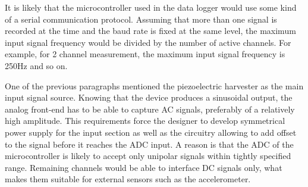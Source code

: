 \documentclass[12pt,a4paper]{article}
\begin{document}
It is likely that the microcontroller used in the data logger would use some kind of a serial communication protocol. Assuming that more than one signal is recorded at the time and the baud rate is fixed at the same level, the maximum input signal frequency would be divided by the number of active channels. For example, for 2 channel measurement, the maximum input signal frequency is 250Hz and so on.
\par

One of the previous paragraphs mentioned the piezoelectric harvester as the main input signal source. Knowing that the device produces a sinusoidal output, the analog front-end has to be able to capture AC signals, preferably of a relatively high amplitude. This requirements force the designer to develop symmetrical power supply for the input section as well as the circuitry allowing to add offset to the signal before it reaches the ADC input. A reason is that the ADC of the microcontroller is likely to accept only unipolar signals within tightly specified range. Remaining channels would be able to interface DC signals only, what makes them suitable for external sensors such as the accelerometer.
\par
\end{document}
